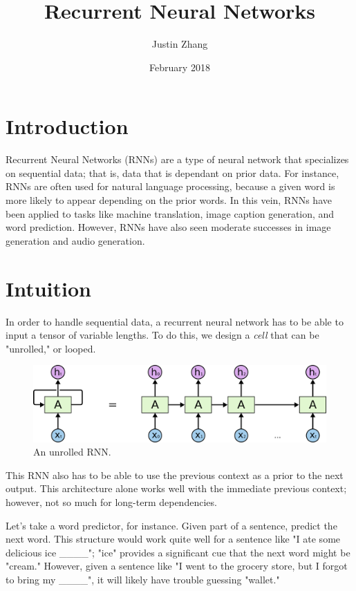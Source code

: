 \documentclass{article}
\title{Recurrent Neural Networks}
\author{Justin Zhang }
\date{February 2018}
\begin{document}
\maketitle

\section{Introduction}
Recurrent Neural Networks (RNNs) are a type of neural network that specializes on sequential data; that is, data that is dependant on prior data. For instance, RNNs are often used for natural language processing, because a given word is more likely to appear depending on the prior words. In this vein, RNNs have been applied to tasks like machine translation, image caption generation, and word prediction. However, RNNs have also seen moderate successes in image generation and audio generation.

\section{Intuition}
    In order to handle sequential data, a recurrent neural network has to be able to input a tensor of variable lengths. To do this, we design a \textit{cell} that can be "unrolled," or looped.
    \begin{figure}[H]
        \centerline{\includegraphics[scale=0.3]{RNN-unrolled.png}}
        \caption{An unrolled RNN.}
        \label{fig:rnn}
    \end{figure}
    This RNN also has to be able to use the previous context as a prior to the next output. This architecture alone works well with the immediate previous context; however, not so much for long-term dependencies.
    
    Let's take a word predictor, for instance. Given part of a sentence, predict the next word. This structure would work quite well for a sentence like "I ate some delicious ice \_\_\_\_"; "ice" provides a significant cue that the next word might be "cream." However, given a sentence like "I went to the grocery store, but I forgot to bring my \_\_\_\_", it will likely have trouble guessing "wallet." 
\end{document}
